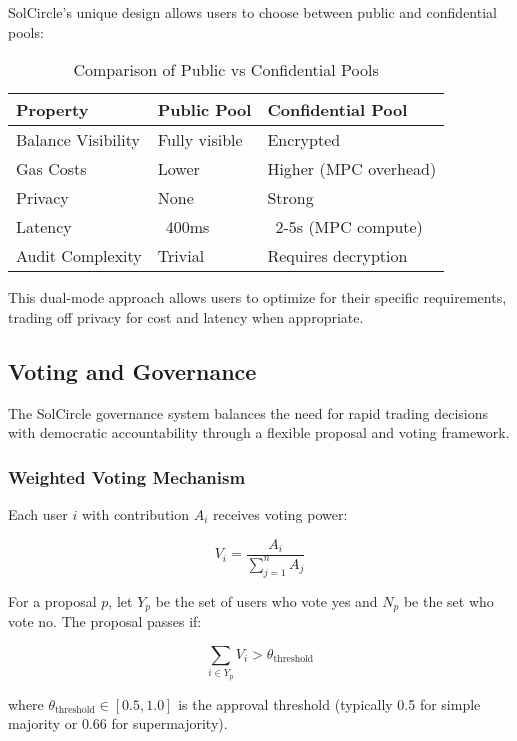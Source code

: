 \documentclass[11pt,a4paper]{article}
\begin{document}
SolCircle's unique design allows users to choose between public and confidential pools:

\begin{table}[h]
\centering
\begin{tabular}{|l|l|l|}
\hline
\textbf{Property} & \textbf{Public Pool} & \textbf{Confidential Pool} \\
\hline
Balance Visibility & Fully visible & Encrypted \\
Gas Costs & Lower & Higher (MPC overhead) \\
Privacy & None & Strong \\
Latency & ~400ms & ~2-5s (MPC compute) \\
Audit Complexity & Trivial & Requires decryption \\
\hline
\end{tabular}
\caption{Comparison of Public vs Confidential Pools}
\end{table}

This dual-mode approach allows users to optimize for their specific requirements, trading off privacy for cost and latency when appropriate.

\subsection{Voting and Governance}

The SolCircle governance system balances the need for rapid trading decisions with democratic accountability through a flexible proposal and voting framework.

\subsubsection{Weighted Voting Mechanism}

Each user $i$ with contribution $A_i$ receives voting power:

\begin{equation}
V_i = \frac{A_i}{\sum_{j=1}^{n} A_j}
\end{equation}

For a proposal $p$, let $Y_p$ be the set of users who vote yes and $N_p$ be the set who vote no. The proposal passes if:

\begin{equation}
\sum_{i \in Y_p} V_i > \theta_{\text{threshold}}
\end{equation}

where $\theta_{\text{threshold}} \in [0.5, 1.0]$ is the approval threshold (typically 0.5 for simple majority or 0.66 for supermajority).
\end{document}
